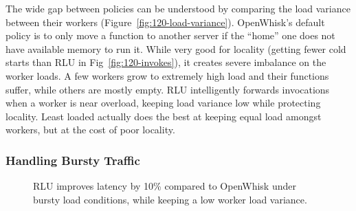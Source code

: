 The wide gap between policies can be understood by comparing the load variance between their workers (Figure~\ref{fig:120-load-variance}).
OpenWhisk's default policy is to only move a function to another server if the ``home'' one does not have available memory to run it. 
While very good for locality (getting fewer cold starts than RLU in Fig~\ref{fig:120-invokes}), it creates severe imbalance on the worker loads.
A few workers grow to extremely high load and their functions suffer, while others are mostly empty. 
RLU intelligently forwards invocations when a worker is near overload, keeping load variance low while protecting locality. 
Least loaded actually does the best at keeping equal load amongst workers, but at the cost of poor locality.


  \vspace*{-0.2cm}
\subsubsection{Handling Bursty Traffic}



\begin{figure}
  \vspace*{-0.4cm}
  \caption{RLU improves latency by 10\% compared to OpenWhisk under bursty load conditions, while keeping a low worker load variance.}
  \label{fig:bursty-closedload}
\end{figure}


